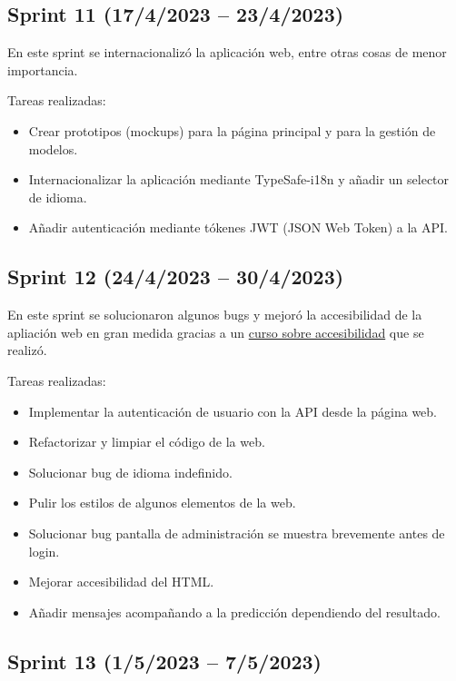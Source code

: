 \subsection{Sprint 11 (17/4/2023 -- 23/4/2023)}

En este sprint se internacionalizó la aplicación web, entre otras cosas de menor
importancia.

Tareas realizadas:

\begin{itemize}
    \item Crear prototipos (mockups) para la página principal y para la gestión de modelos.
    \item Internacionalizar la aplicación mediante TypeSafe-i18n y añadir un selector de idioma.
    \item Añadir autenticación mediante tókenes JWT (JSON Web Token) a la API.
\end{itemize}

\subsection{Sprint 12 (24/4/2023 -- 30/4/2023)}

En este sprint se solucionaron algunos bugs y mejoró la accesibilidad de la
apliación web en gran medida gracias a un
\href{https://www.udacity.com/course/web-accessibility--ud891}{curso sobre
accesibilidad} que se realizó.

Tareas realizadas:

\begin{itemize}
    \item Implementar la autenticación de usuario con la API desde la página web.
    \item Refactorizar y limpiar el código de la web.
    \item Solucionar bug de idioma indefinido.
    \item Pulir los estilos de algunos elementos de la web.
    \item Solucionar bug pantalla de administración se muestra brevemente antes de login.
    \item Mejorar accesibilidad del HTML.
    \item Añadir mensajes acompañando a la predicción dependiendo del resultado.
\end{itemize}

\subsection{Sprint 13 (1/5/2023 -- 7/5/2023)}

